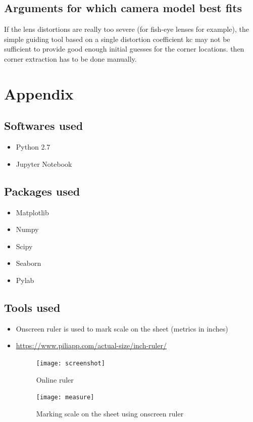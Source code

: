 \documentclass[11pt,a4paper]{article}
\begin{document}
				
				\subsection{Arguments for which camera model best fits} 
				If the lens distortions are really too severe (for fish-eye lenses for example), the simple guiding tool based on a single distortion coefficient kc may not be sufficient to provide good enough initial guesses for the corner locations. then corner extraction has to be done manually.
				
				\newpage
				\section{Appendix}
				\subsection{Softwares used}
				\begin{itemize}
					\item Python 2.7
					\item Jupyter Notebook
				\end{itemize}
				
				\subsection{Packages used}
				\begin{itemize}
					\item Matplotlib
					\item Numpy
					\item Scipy
					\item Seaborn
					\item Pylab
				\end{itemize}
				
				\subsection{Tools used}
				\begin{itemize}
					\item Onscreen ruler is used to mark scale on the sheet (metrics in inches)
					\item \url{https://www.piliapp.com/actual-size/inch-ruler/}
					\begin{figure}[H]
						\centering	
						\texttt{[image: screenshot]}
						\label{fig:sub1}
						\caption{Online ruler}
					\end{figure}
					
					\begin{figure}[H]
						\centering	
						\texttt{[image: measure]}
						\label{fig:sub1}
						\caption{Marking scale on the sheet using onscreen ruler}
					\end{figure}
					
				\end{itemize}
			
\end{document}
